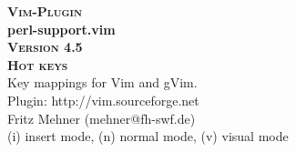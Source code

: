 \documentclass[oneside,10pt,landscape,DIV17]{scrartcl}
\newcommand{\Pluginversion}{4.5}
\begin{document}
%

\begin{multicols}{3}
%
\begin{center}
%
\textbf{\textsc{\small{Vim-Plugin}}}\\
\textbf{\LARGE{perl-support.vim}}\\
\textbf{\textsc{\small{Version \Pluginversion}}}\\
\vspace{5mm}%
\textbf{\textsc{\Huge{Hot keys}}}\\ 
\vspace{5mm}%
Key mappings for Vim and gVim.\\
Plugin: http://vim.sourceforge.net\\
Fritz Mehner (mehner@fh-swf.de)\\
\vspace{1.0mm}
{\normalsize (i)} insert mode, {\normalsize (n)} normal mode, {\normalsize (v)} visual mode\\
\vspace{4.0mm}


\end{center}
\end{multicols}
\end{document}
